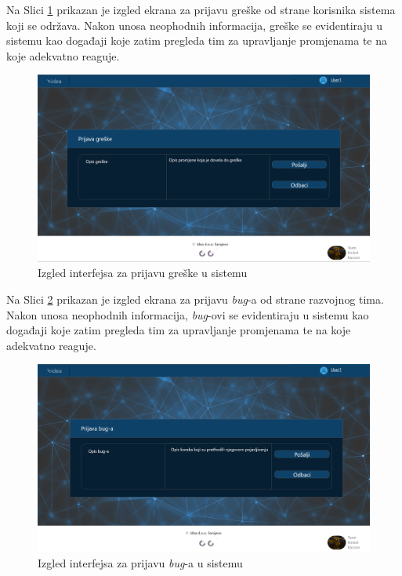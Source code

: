 \documentclass[12pt,a4paper]{article}
\begin{document}
\newpage

Na Slici \ref{pt5} prikazan je izgled ekrana za prijavu greške od strane korisnika sistema koji se održava. Nakon unosa neophodnih informacija, greške se evidentiraju u sistemu kao događaji koje zatim pregleda tim za upravljanje promjenama te na koje adekvatno reaguje.

\begin{figure}[H]
\center
\includegraphics[scale=0.4]{../res/Prototype/Greske.PNG}
\caption{Izgled interfejsa za prijavu greške u sistemu}
\label{pt5}
\end{figure}

Na Slici \ref{pt6} prikazan je izgled ekrana za prijavu \textit{bug}-a od strane razvojnog tima. Nakon unosa neophodnih informacija, \textit{bug}-ovi se evidentiraju u sistemu kao događaji koje zatim pregleda tim za upravljanje promjenama te na koje adekvatno reaguje.

\begin{figure}[H]
\center
\includegraphics[scale=0.4]{../res/Prototype/Bugovi.PNG}
\caption{Izgled interfejsa za prijavu \textit{bug}-a u sistemu}
\label{pt6}
\end{figure}
\end{document}
